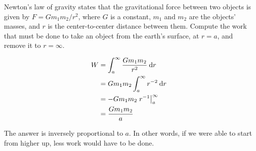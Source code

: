\begin{eg}
\egquestion Newton's law of gravity states that the gravitational force between two objects
is given by $F=Gm_1m_2/r^2$, where $G$ is a constant, $m_1$ and $m_2$ are the objects' masses,
and $r$ is the center-to-center distance between them. Compute the work that must be done
to take an object from the earth's surface, at $r=a$, and remove it to $r=\infty$.

\eganswer
\begin{align*}
  W &= \int_a^\infty \frac{Gm_1m_2}{r^2} \: \textup{d} r \\
    &= Gm_1m_2 \int_a^\infty r^{-2} \: \textup{d} r \\
    &= -Gm_1m_2 \left.r^{-1}\right|_a^\infty  \\
    &= \frac{Gm_1m_2}{a}
\end{align*}

The answer is inversely proportional to $a$. In other words, if we were able to start from
higher up, less work would have to be done.
\end{eg}


